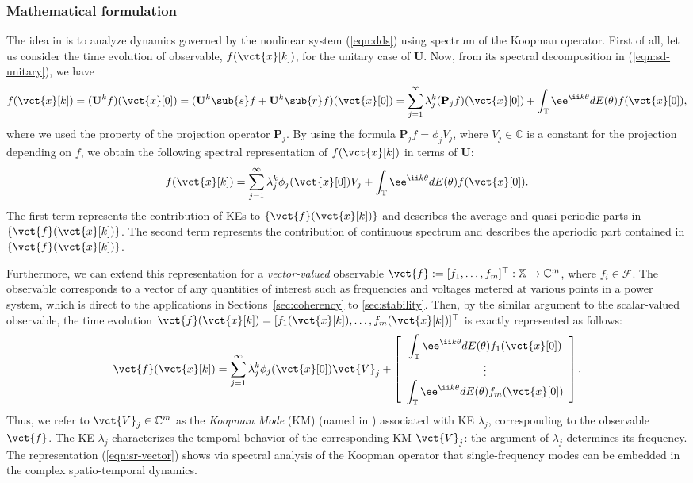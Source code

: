 \documentclass[a4paper,10pt]{article}
\def\bU{{\mathbf{U}}}
\def\bP{{\mathbf{P}}}
\def\bbX{{\mathbb{X}}}
\def\bbC{{\mathbb{C}}}
\def\cF{{\mathcal{F}}}
\begin{document}
\subsubsection{Mathematical formulation}
\label{subsec:KM-math}

The idea in \cite{Mezic_ND41} is to analyze dynamics governed by the nonlinear system (\ref{eqn:dds}) using spectrum of the Koopman operator.   
First of all, let us consider the time evolution of observable, $f(\vct{x}[k])$, for the unitary case of $\bU$.  
Now, from its spectral decomposition in (\ref{eqn:sd-unitary}), we have
\[
f(\vct{x}[k])=(\bU^kf)(\vct{x}[0])
=(\bU^k\sub{s}f+\bU^k\sub{r}f)(\vct{x}[0])
=\sum_{j=1}^\infty\lambda^k_j(\bP_jf)(\vct{x}[0])
+\int_\mathbb{T}\ee^{\ii k\theta}dE(\theta)f(\vct{x}[0]),
\]
where we used the property of the projection operator $\bP_j$.  
By using the formula $\bP_jf=\phi_jV_j$, where $V_j\in\bbC$ is a constant for the projection depending on $f$, we obtain the following spectral representation of $f(\vct{x}[k])$ in terms of $\bU$:
\[
f(\vct{x}[k])
=\sum_{j=1}^\infty\lambda^k_j\phi_j(\vct{x}[0])V_j
+\int_\mathbb{T}\ee^{\ii k\theta}dE(\theta)f(\vct{x}[0]).
\]
The first term represents the contribution of KEs to $\{\vct{f}(\vct{x}[k])\}$ and describes the average and quasi-periodic parts in $\{\vct{f}(\vct{x}[k])\}$.  
The second term represents the contribution of continuous spectrum and describes the aperiodic part contained in $\{\vct{f}(\vct{x}[k])\}$.  

%
Furthermore, we can extend this representation for a \emph{vector-valued} observable $\vct{f}:=[f_1,\ldots,f_m]^\top: \bbX\to\bbC^m$, where $f_i\in\cF$.  
The observable corresponds to a vector of any quantities of interest such as frequencies and voltages metered at various points in a power system, which is direct to the applications in Sections~\ref{sec:coherency} to \ref{sec:stability}.  
Then, by the similar argument to the scalar-valued observable, the time evolution $\vct{f}(\vct{x}[k])=[f_1(\vct{x}[k]),\ldots,f_m(\vct{x}[k])]^\top$ is exactly represented as follows:
\begin{equation}
\vct{f}(\vct{x}[k])=\sum_{j=1}^{\infty}\lambda^k_j\phi_j(\vct{x}[0])\vct{V}_j+
\left[
\begin{array}{c}
{\displaystyle \int_\mathbb{T}\ee^{\ii k\theta}dE(\theta)f_1(\vct{x}[0])}\\
\vdots\\
{\displaystyle \int_\mathbb{T}\ee^{\ii k\theta}dE(\theta)f_m(\vct{x}[0])}
\end{array}
\right].
\label{eqn:sr-vector}
\end{equation}
Thus, we refer to $\vct{V}_j\in\bbC^m$ as the \emph{Koopman Mode} (KM) (named in \cite{Rowley_JFM641}) associated with KE $\lambda_j$, corresponding to the observable $\vct{f}$.  
The KE $\lambda_j$ characterizes the temporal behavior of the corresponding KM $\vct{V}_j$: the argument of $\lambda_j$ determines its frequency.  
The representation (\ref{eqn:sr-vector}) shows via spectral analysis of the Koopman operator that single-frequency modes can be embedded in the complex spatio-temporal dynamics.
\end{document}

